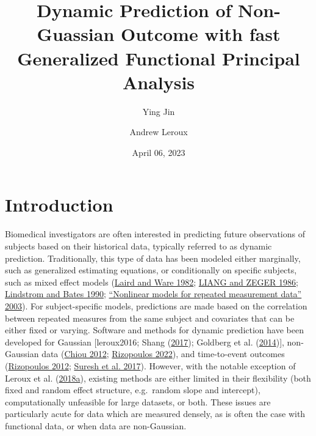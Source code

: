 \documentclass[
  11pt,
]{article}
\title{Dynamic Prediction of Non-Guassian Outcome with fast Generalized
Functional Principal Analysis}
\author{Ying Jin \and Andrew Leroux}
\date{April 06, 2023}
\begin{document}
\maketitle

\hypertarget{introduction}{%
\section{Introduction}\label{introduction}}

Biomedical investigators are often interested in predicting future
observations of subjects based on their historical data, typically
referred to as dynamic prediction. Traditionally, this type of data has
been modeled either marginally, such as generalized estimating
equations, or conditionally on specific subjects, such as mixed effect
models (\protect\hyperlink{ref-Laird1982}{Laird and Ware 1982};
\protect\hyperlink{ref-liang1986}{LIANG and ZEGER 1986};
\protect\hyperlink{ref-lindstrom1990}{Lindstrom and Bates 1990};
\protect\hyperlink{ref-davidian2003}{{``Nonlinear models for repeated
measurement data''} 2003}). For subject-specific models, predictions are
made based on the correlation between repeated measures from the same
subject and covariates that can be either fixed or varying. Software and
methods for dynamic prediction have been developed for Gaussian
{[}leroux2016; Shang (\protect\hyperlink{ref-shang2017}{2017}); Goldberg
et al. (\protect\hyperlink{ref-goldberg2014}{2014}){]}, non-Gaussian
data (\protect\hyperlink{ref-chiou2012}{Chiou 2012};
\protect\hyperlink{ref-GLMMadaptive}{Rizopoulos 2022}), and
time-to-event outcomes (\protect\hyperlink{ref-jmbook}{Rizopoulos 2012};
\protect\hyperlink{ref-suresh2017}{Suresh et al. 2017}). However, with
the notable exception of Leroux et al.
(\protect\hyperlink{ref-leroux2016}{2018a}), existing methods are either
limited in their flexibility (both fixed and random effect structure,
e.g.~random slope and intercept), computationally unfeasible for large
datasets, or both. These issues are particularly acute for data which
are measured densely, as is often the case with functional data, or when
data are non-Gaussian.
\end{document}
